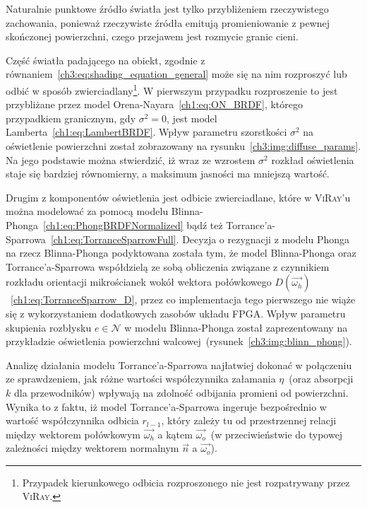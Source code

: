 \begin{enumerate}
Naturalnie punktowe źródło światła jest tylko przybliżeniem rzeczywistego zachowania, ponieważ rzeczywiste źródła emitują promieniowanie z pewnej skończonej powierzchni, czego przejawem jest rozmycie granic cieni. 



Część światła padającego na obiekt, zgodnie z równaniem~\eqref{ch3:eq:shading_equation_general} może się na nim rozproszyć lub odbić w sposób zwierciadlany\footnote{Przypadek kierunkowego odbicia rozproszonego nie jest rozpatrywany przez \textsc{ViRay}.}. W pierwszym przypadku rozproszenie to jest przybliżane przez model Orena-Nayara~\eqref{ch1:eq:ON_BRDF}, którego przypadkiem granicznym, gdy $\sigma^2 = 0$, jest model Lamberta~\eqref{ch1:eq:LambertBRDF}. Wpływ parametru szorstkości $\sigma^2$ na oświetlenie powierzchni został zobrazowany na rysunku~\ref{ch3:img:diffuse_params}. Na jego podstawie można stwierdzić, iż wraz ze wzrostem $\sigma^2$ rozkład oświetlenia staje się bardziej równomierny, a maksimum jasności ma mniejszą wartość. 



Drugim z komponentów oświetlenia jest odbicie zwierciadlane, które w \textsc{ViRay}'u można modelować za pomocą modelu Blinna-Phonga~\eqref{ch1:eq:PhongBRDFNormalized} bądź też Torrance'a-Sparrowa~\eqref{ch1:eq:TorranceSparrowFull}. Decyzja o rezygnacji z modelu Phonga na rzecz Blinna-Phonga podyktowana została tym, że model Blinna-Phonga oraz Torrance'a-Sparrowa współdzielą ze sobą obliczenia związane z czynnikiem rozkładu orientacji mikrościanek wokół wektora połówkowego $D(\vec{\omega_h})$~\eqref{ch1:eq:TorranceSparrow_D}, przez co implementacja tego pierwszego nie wiąże się z wykorzystaniem dodatkowych zasobów układu FPGA. Wpływ parametru skupienia rozbłysku $e \in \mathcal{N}$ w modelu Blinna-Phonga został zaprezentowany na przykładzie oświetlenia powierzchni walcowej~(rysunek~\ref{ch3:img:blinn_phong}).


Analizę działania modelu Torrance'a-Sparrowa najłatwiej dokonać w połączeniu ze sprawdzeniem, jak różne wartości współczynnika załamania $\eta$~(oraz absorpcji $k$ dla przewodników) wpływają na zdolność odbijania promieni od powierzchni. Wynika to z faktu, iż model Torrance'a-Sparrowa ingeruje bezpośrednio w wartość współczynnika odbicia $r_{l-1}$, który zależy tu od przestrzennej relacji między wektorem połówkowym $\vec{\omega_h}$ a kątem $\vec{\omega_o}$~(w przeciwieństwie do typowej zależności między wektorem normalnym $\vec{n}$ a $\vec{\omega_o}$).


\end{enumerate}
